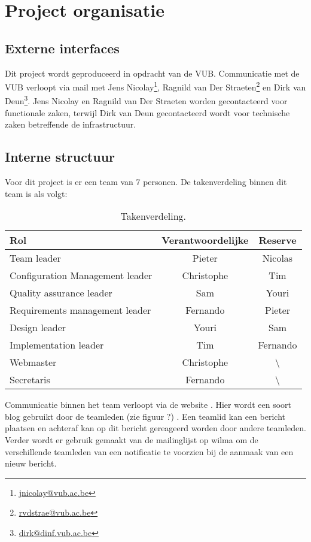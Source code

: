 \chapter{Project organisatie}
\section{Externe interfaces}
Dit project wordt geproduceerd in opdracht van de VUB. Communicatie met de VUB verloopt via mail met Jens Nicolay\footnote{\href{mailto:jnicolay@vub.ac.be}{jnicolay@vub.ac.be}}, Ragnild van Der Straeten\footnote{\href{mailto:rvdstrae@vub.ac.be}{rvdstrae@vub.ac.be}} en Dirk van Deun\footnote{\href{mailto:dirk@dinf.vub.ac.be}{dirk@dinf.vub.ac.be}}. Jens Nicolay en Ragnild van Der Straeten worden gecontacteerd voor functionale zaken, terwijl Dirk van Deun gecontacteerd wordt voor technische zaken betreffende de infrastructuur.

\section{Interne structuur}
Voor dit project is er een team van 7 personen. De takenverdeling binnen dit team is als volgt:
\begin{table} [H]
	\centering
	\caption{Takenverdeling.}
	\begin{tabular} {l|cc}
		Rol & Verantwoordelijke & Reserve \\
		\hline
		Team leader & Pieter & Nicolas \\
		Configuration Management leader & Christophe & Tim \\
		Quality assurance leader & Sam & Youri \\
		Requirements management leader & Fernando & Pieter \\
		Design leader & Youri & Sam \\
		Implementation leader & Tim & Fernando \\
		\hline
		Webmaster & Christophe & \textbackslash \\
		Secretaris & Fernando & \textbackslash 
	\end{tabular}
	\label{tab:takenverdeling}
\end{table}

Communicatie binnen het team verloopt via de website \cite{portalWebsite}. Hier wordt een soort blog gebruikt door de teamleden (zie figuur ?) . Een teamlid kan een bericht plaatsen en achteraf kan op dit bericht gereageerd worden door andere teamleden. Verder wordt er gebruik gemaakt van de mailinglijst op wilma om de verschillende teamleden van een notificatie te voorzien bij de aanmaak van een nieuw bericht. 

